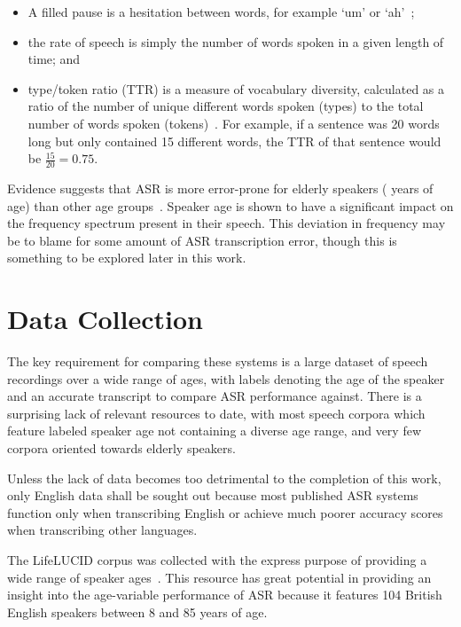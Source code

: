 \begin{itemize}
    \item A filled pause is a hesitation between words, for example `um' or
    `ah'~\cite{Maclay1959Jan};
    \item the rate of speech is simply the number of words spoken in a given length of time;
    and
    \item type/token ratio (TTR) is a measure of vocabulary diversity, calculated as a ratio of
    the number of unique different words spoken (types) to the total number of words spoken
    (tokens)~\cite{richards_1987}.
    For example, if a sentence was 20 words long but only contained 15 different words, the TTR of
    that sentence would be $\frac{15}{20} = 0.75$.
\end{itemize}

Evidence suggests that ASR is more error-prone for elderly speakers ( years of
age) than other age groups~\cite{picone1990,vote400}.
Speaker age is shown to have a significant impact on the frequency spectrum present in their
speech\cite{Taylor2020Mar}.
This deviation in frequency may be to blame for some amount of ASR transcription error, though
this is something to be explored later in this work.

\section{Data Collection}\label{sec:data-collection}

The key requirement for comparing these systems is a large dataset of speech recordings over a
wide range of ages, with labels denoting the age of the speaker and an accurate transcript to
compare ASR performance against.
There is a surprising lack of relevant resources to date, with most speech corpora which feature
labeled speaker age not containing a diverse age range, and very few corpora oriented towards
elderly speakers.

Unless the lack of data becomes too detrimental to the completion of this work, only English data
shall be sought out because most published ASR systems function only when transcribing English
or achieve much poorer accuracy scores when transcribing other languages.

The LifeLUCID corpus was collected with the express purpose of providing a wide range of
speaker ages~\cite{lifelucid}.
This resource has great potential in providing an insight into the age-variable performance of
ASR because it features 104 British English speakers between 8 and 85 years of age.

